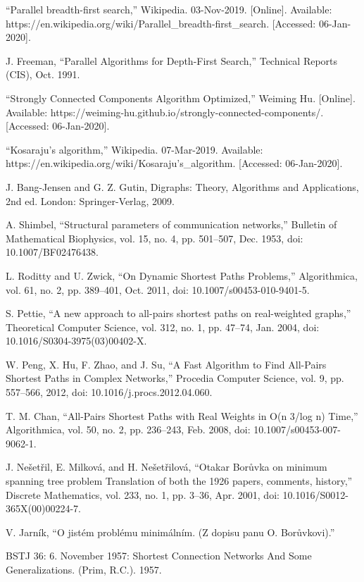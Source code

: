 \documentclass[journal,twoside,web]{ieeecolor}
\begin{document}
\begin{thebibliography}{9}
     “Parallel breadth-first search,” Wikipedia. 03-Nov-2019. [Online]. Available: https://en.wikipedia.org/wiki/Parallel{\_}breadth-first{\_}search. [Accessed: 06-Jan-2020].

     J. Freeman, “Parallel Algorithms for Depth-First Search,” Technical Reports (CIS), Oct. 1991.

     “Strongly Connected Components Algorithm Optimized,” Weiming Hu. [Online]. Available: https://weiming-hu.github.io/strongly-connected-components/. [Accessed: 06-Jan-2020].

     “Kosaraju’s algorithm,” Wikipedia. 07-Mar-2019.  Available: https://en.wikipedia.org/wiki/Kosaraju's{\_}algorithm. [Accessed: 06-Jan-2020].

     J. Bang-Jensen and G. Z. Gutin, Digraphs: Theory, Algorithms and Applications, 2nd ed. London: Springer-Verlag, 2009.

     A. Shimbel, “Structural parameters of communication networks,” Bulletin of Mathematical Biophysics, vol. 15, no. 4, pp. 501–507, Dec. 1953, doi: 10.1007/BF02476438.

     L. Roditty and U. Zwick, “On Dynamic Shortest Paths Problems,” Algorithmica, vol. 61, no. 2, pp. 389–401, Oct. 2011, doi: 10.1007/s00453-010-9401-5.

     S. Pettie, “A new approach to all-pairs shortest paths on real-weighted graphs,” Theoretical Computer Science, vol. 312, no. 1, pp. 47–74, Jan. 2004, doi: 10.1016/S0304-3975(03)00402-X.

     W. Peng, X. Hu, F. Zhao, and J. Su, “A Fast Algorithm to Find All-Pairs Shortest Paths in Complex Networks,” Procedia Computer Science, vol. 9, pp. 557–566, 2012, doi: 10.1016/j.procs.2012.04.060.

     T. M. Chan, “All-Pairs Shortest Paths with Real Weights in O(n 3/log n) Time,” Algorithmica, vol. 50, no. 2, pp. 236–243, Feb. 2008, doi: 10.1007/s00453-007-9062-1.

     J. Nešetřil, E. Milková, and H. Nešetřilová, “Otakar Borůvka on minimum spanning tree problem Translation of both the 1926 papers, comments, history,” Discrete Mathematics, vol. 233, no. 1, pp. 3–36, Apr. 2001, doi: 10.1016/S0012-365X(00)00224-7.

     V. Jarník, “O jistém problému minimálním. (Z dopisu panu O. Borůvkovi).”
    
     BSTJ 36: 6. November 1957: Shortest Connection Networks And Some Generalizations. (Prim, R.C.). 1957.


\end{thebibliography}
\end{document}
